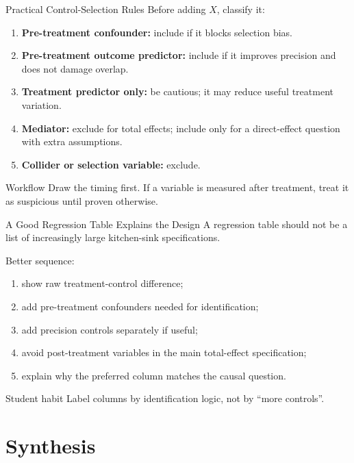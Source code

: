 \documentclass[11pt,aspectratio=169]{beamer}
\begin{document}
\begin{frame}{Practical Control-Selection Rules}
  Before adding \(X\), classify it:
  \begin{enumerate}
    \item \textbf{Pre-treatment confounder:} include if it blocks selection bias.
    \item \textbf{Pre-treatment outcome predictor:} include if it improves precision and does not damage overlap.
    \item \textbf{Treatment predictor only:} be cautious; it may reduce useful treatment variation.
    \item \textbf{Mediator:} exclude for total effects; include only for a direct-effect question with extra assumptions.
    \item \textbf{Collider or selection variable:} exclude.
  \end{enumerate}
  \begin{block}{Workflow}
    Draw the timing first. If a variable is measured after treatment, treat it as suspicious until proven otherwise.
  \end{block}
\end{frame}

\begin{frame}{A Good Regression Table Explains the Design}
  A regression table should not be a list of increasingly large kitchen-sink specifications.
  \vspace{0.3em}

  Better sequence:
  \begin{enumerate}
    \item show raw treatment-control difference;
    \item add pre-treatment confounders needed for identification;
    \item add precision controls separately if useful;
    \item avoid post-treatment variables in the main total-effect specification;
    \item explain why the preferred column matches the causal question.
  \end{enumerate}
  \begin{block}{Student habit}
    Label columns by identification logic, not by ``more controls''.
  \end{block}
\end{frame}

\section{Synthesis}
\end{document}

